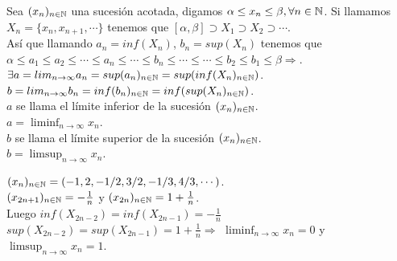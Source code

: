 \begin{definition}
  Sea $(x_n)_{n \in \mathbb{N}}$ una sucesión acotada, digamos $\alpha \leq x_n \leq \beta, \forall n \in \mathbb{N}$.
  Si llamamos $X_n = \{ x_n, x_{n+1}, \cdots \}$ tenemos que $[\alpha, \beta] \supset X_1 \supset X_2 \supset \cdots$. \\
  Así que llamando $a_n = inf(X_n)$, $b_n = sup(X_n)$ tenemos que \\
  $\alpha \leq a_1 \leq a_2 \leq \cdots \leq a_n \leq \cdots \leq b_n \leq \cdots \leq \cdots \leq b_2 \leq b_1 \leq \beta \Rightarrow$. \\
  $\exists a = lim_{n \to \infty} a_n = sup(a_n)_{n \in \mathbb{N}} = sup(inf(X_n)_{n \in \mathbb{N}})$. \\
  $b = lim_{n \to \infty} b_n = inf(b_n)_{n \in \mathbb{N}} = inf(sup(X_n)_{n \in \mathbb{N}})$. \\
  
  $a$ se llama el límite inferior de la sucesión $(x_n)_{n \in \mathbb{N}}$. \\
  $a = \liminf_{n \to \infty} x_n$. \\

  $b$ se llama el límite superior de la sucesión $(x_n)_{n \in \mathbb{N}}$. \\
  $b = \limsup_{n \to \infty} x_n$.
\end{definition}

\begin{eg}
  $(x_n)_{n \in \mathbb{N}} = (-1, 2, -1/2, 3/2, -1/3, 4/3, \cdots)$. \\
  $(x_{2n+1})_{n \in \mathbb{N}} = -\frac{1}{n}$ y $(x_{2n})_{n \in \mathbb{N}} = 1 + \frac{1}{n}$. \\
  Luego $inf(X_{2n-2}) = inf(X_{2n-1}) = -\frac{1}{n}$ \\
  $sup(X_{2n-2}) = sup(X_{2n-1}) = 1 + \frac{1}{n} \Rightarrow$
  $\liminf_{n \to \infty} x_n = 0$ y $\limsup_{n \to \infty} x_n = 1$.
\end{eg}

